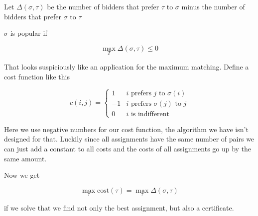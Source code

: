 \begin{Def} Let $\Delta(\sigma,\tau)$ be the number of bidders that prefer $\tau$ to $\sigma$ minus the number of bidders that prefer $\sigma$ to $\tau$

$\sigma$ is popular if 

\[\max _T \Delta (\sigma, \tau) \leq 0\]
\end{Def}

That looks suspiciously like an application for the maximum matching. Define a cost function like this

\[c(i,j) = \begin{cases}
1 & i \text{ prefers } j \text{ to } \sigma(i)\\
-1 & i \text{ prefers } \sigma(j) \text{ to } j\\
0 & i \text{ is indifferent}
\end{cases}\]

Here we use negative numbers for our cost function, the algorithm we have isn't designed for that. Luckily since all assignments have the same number of pairs we can just add a constant to all costs and the costs of all assignments go up by the same amount.

Now we get

\[\max_\tau \text{cost}(\tau) = \max_\tau \Delta(\sigma,\tau)\]

if we solve that we find not only the best assignment, but also a certificate. %